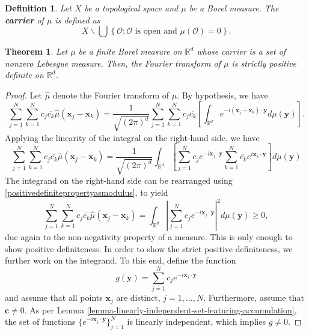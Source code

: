 \documentclass[12pt]{report} %
\newtheorem{definition}{Definition}
\newtheorem{theorem}{Theorem}
\newcommand{\tmmathbf}[1]{\ensuremath{\boldsymbol{#1}}}
\newcommand{\tmstrong}[1]{\textbf{#1}}
\begin{document}
\begin{definition}
  Let $X$ be a topological space and $\mu$ be a Borel measure.
  The {\tmstrong{carrier }}of $\mu$ is defined as
  \[ X\backslash \bigcup \left\{ \mathcal{O}: \mathcal{O} \text{ is open and }
     \mu (\mathcal{O}) = 0 \right\} . \]
\end{definition}

\begin{theorem}
  Let $\mu$ be a finite Borel measure on $\mathbb{R}^d$ whose
  carrier is a set of nonzero Lebesgue measure. Then, the Fourier transform of
  $\mu$ is strictly positive definite on $\mathbb{R}^d$.
\end{theorem}

\begin{proof}
  Let $\hat{\mu}$ denote the Fourier transform of $\mu$. By hypothesis,
  we have
  \[ \sum_{j = 1}^N \sum_{k = 1}^N c_j \overline{c_k} \hat{\mu}
     (\tmmathbf{x}_j -\tmmathbf{x}_k) = \frac{1}{\sqrt{(2 \pi)^d}} \sum_{j =
     1}^N \sum_{k = 1}^N c_j \overline{c_k}  \left[ \int_{\mathbb{R}^d} e^{- i
     (\tmmathbf{x}_j -\tmmathbf{x}_k) \cdot \tmmathbf{y}} d \mu (\tmmathbf{y})
     \right] . \]
  Applying the linearity of the integral on the right-hand side, we have
  \[ \sum_{j = 1}^N \sum_{k = 1}^N c_j \overline{c_k} \hat{\mu}
     (\tmmathbf{x}_j -\tmmathbf{x}_k) = \frac{1}{\sqrt{(2 \pi)^d}}
     \int_{\mathbb{R}^d} \left[ \sum_{j = 1}^N c_j e^{- i\tmmathbf{x}_j \cdot
     \tmmathbf{y}} \sum_{k = 1}^N \overline{c_k} e^{i\tmmathbf{x}_k \cdot
     \tmmathbf{y}} \right] d \mu (\tmmathbf{y}) \]
  The integrand on the right-hand side can be rearranged using
  \eqref{positivedefinitepropertyasmodulus}, to yield
  \begin{equation}
    \sum_{j = 1}^N \sum_{k = 1}^N c_j \overline{c_k} \hat{\mu} (\tmmathbf{x}_j
    -\tmmathbf{x}_k) = \int_{\mathbb{R}^d} \left| \sum_{j = 1}^N c_j e^{-
    i\tmmathbf{x}_j \cdot \tmmathbf{y}} \right|^2 d \mu (\tmmathbf{y}) \geq 0,
    \label{non-strict-inequality-measure-borel}
  \end{equation}
  due again to the non-negativity property of a measure. This is only enough to
  show positive definiteness. In order to show the strict positive
  definiteness, we further work on the integrand. To this end, define the
  function
  \[ g (\tmmathbf{y}) = \sum_{j = 1}^N c_j e^{- i\tmmathbf{x}_j \cdot
     \tmmathbf{y}} \]
  and assume that all points $\tmmathbf{x}_j$ are distinct, $j = 1, \ldots,
  N$. Furthermore, assume that $\tmmathbf{c} \neq 0$. As per Lemma
  \ref{lemma-linearly-independent-set-featuring-accumulation}, the set of
  functions $\{ e^{- i\tmmathbf{x}_j \cdot \tmmathbf{y}} \}_{j = 1}^N$ is
  linearly independent, which implies $g \neq 0$.
  

\end{proof}
\end{document}
